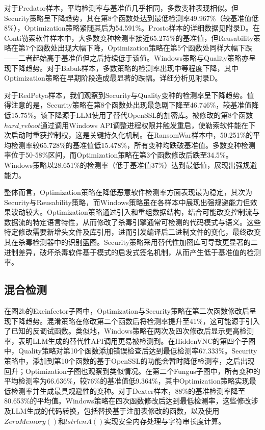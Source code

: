 对于Predator样本，平均检测率与基准值几乎相同，多数变种表现相似。但Security策略呈下降趋势，其在第8个函数处达到最低检测率49.967\%（较基准值低8\%），Optimization策略紧随其后为54.591\%。Prosto样本的详细数据见附录D。在Conti勒索软件样本中，大多数变种检测率接近65.275\%的基准值，但Reusability策略在第7个函数处出现大幅下降，Optimization策略在第5个函数处同样大幅下跌——二者起始高于基准值但之后持续低于该值。Windows策略与Quality策略亦呈现下降趋势。对于Babuk样本，多数策略的检测率出现中等程度下降，其中Optimization策略在早期阶段造成最显著的跌幅。详细分析见附录D。

对于RedPetya样本，我们观察到Security与Quality变种的检测率呈下降趋势。值得注意的是，Security策略在第8个函数处出现最急剧下降至46.746\%，较基准值降低15.75\%。该下降源于LLM使用了替代OpenSSL的加密库。被修改的第8个函数$hard\_reboot$通过调用Windows API调整进程权限并触发重启，使勒索软件能在下次启动时重获控制权，这是关键持久化机制。在RansomWar样本中，50.251\%的平均检测率较65.728\%的基准值低15.478\%，所有变种均跌破基准值。多数变种检测率位于50-58\%区间，而Optimization策略在第3个函数修改后跌至34.5\%。Windows策略以28.651\%的检测率（低于基准值37\%）达到最低值，展现出强规避能力。

整体而言，Optimization策略在降低恶意软件检测率方面表现最为稳定，其次为Security与Reusability策略，而Windows策略虽在各样本中展现出强规避能力但效果波动较大。Optimization策略通过引入和重组数据结构，结合可能改变控制流与数据流的特定语言特性，从而修改了杀毒引擎通常可检测的代码模式与语义。这些特定修改需要新增头文件及库引用，进而引发编译后二进制文件的变化，最终改变其在杀毒检测器中的识别蓝图。Security策略采用替代性加密库可导致更显著的二进制差异，破坏杀毒软件基于模式的启发式签名机制，从而产生低于基准值的检测率。

\subsection{混合检测}
在图2b的Exeinfector子图中，Optimization与Security策略在第二次函数修改后呈现下降趋势。混淆策略在修改第二个函数后将检测率提升至41\%，这可能源于引入了已知的反调试函数。类似地，Windows策略在两次及四次修改后显示更高检测率，表明LLM生成的替代性API调用更易被检测到。在HiddenVNC的第四个子图中，Quality策略对第10个函数添加错误检查后达到最低检测率67.333\%。Security策略中，添加到第10个函数的基于OpenSSL的功能会暂时降低检测率，之后出现回升；Optimization子图也观察到类似情况。在第二个Fungus子图中，所有变种的平均检测率为66.636\%，较76\%的基准值低9.364\%，其中Optimization策略实现最低检测率并生成最具规避性的变种。对于Dexter样本，88\%的基准检测率降至80.653\%的平均值。Windows策略在四次函数修改后达到最低检测率，这些修改涉及LLM生成的代码转换，包括替换基于注册表修改的函数，以及使用$ZeroMemory()$和$lstrlenA()$实现安全内存处理与字符串长度计算。

